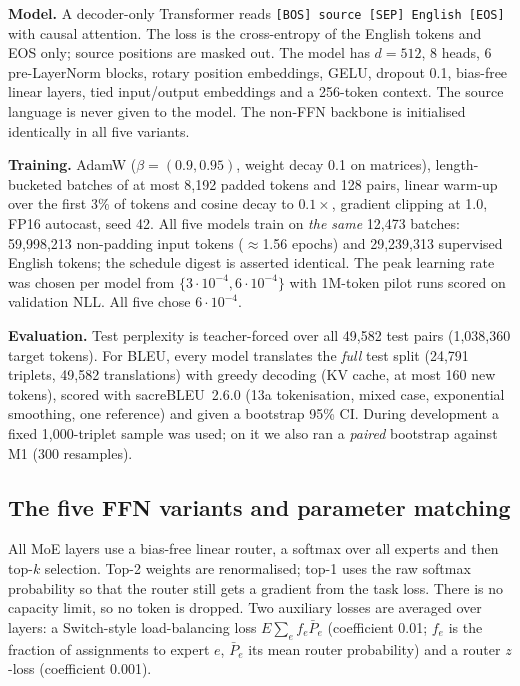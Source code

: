 \documentclass[11pt,a4paper]{article}
\begin{document}
\textbf{Model.} A decoder-only Transformer reads \texttt{[BOS] source [SEP] English [EOS]} with causal attention. The loss is the cross-entropy of the English tokens and EOS only; source positions are masked out. The model has $d=512$, 8 heads, 6 pre-LayerNorm blocks, rotary position embeddings, GELU, dropout 0.1, bias-free linear layers, tied input/output embeddings and a 256-token context. The source language is never given to the model. The non-FFN backbone is initialised identically in all five variants.

\textbf{Training.} AdamW ($\beta=(0.9,0.95)$, weight decay 0.1 on matrices), length-bucketed batches of at most 8,192 padded tokens and 128 pairs, linear warm-up over the first 3\% of tokens and cosine decay to $0.1\times$, gradient clipping at 1.0, FP16 autocast, seed 42. All five models train on \emph{the same} 12,473 batches: 59,998,213 non-padding input tokens ($\approx$1.56 epochs) and 29,239,313 supervised English tokens; the schedule digest is asserted identical. The peak learning rate was chosen per model from $\{3\cdot10^{-4}, 6\cdot10^{-4}\}$ with 1M-token pilot runs scored on validation NLL. All five chose $6\cdot10^{-4}$.

\textbf{Evaluation.} Test perplexity is teacher-forced over all 49,582 test pairs (1,038,360 target tokens). For BLEU, every model translates the \emph{full} test split (24,791 triplets, 49,582 translations) with greedy decoding (KV cache, at most 160 new tokens), scored with sacreBLEU~2.6.0 (13a tokenisation, mixed case, exponential smoothing, one reference) and given a bootstrap 95\% CI. During development a fixed 1,000-triplet sample was used; on it we also ran a \emph{paired} bootstrap against M1 (300 resamples).

\subsection{The five FFN variants and parameter matching}
All MoE layers use a bias-free linear router, a softmax over all experts and then top-$k$ selection. Top-2 weights are renormalised; top-1 uses the raw softmax probability so that the router still gets a gradient from the task loss. There is no capacity limit, so no token is dropped. Two auxiliary losses are averaged over layers: a Switch-style load-balancing loss $E\sum_e f_e\bar P_e$ (coefficient 0.01; $f_e$ is the fraction of assignments to expert $e$, $\bar P_e$ its mean router probability) and a router $z$-loss (coefficient 0.001).
\end{document}
